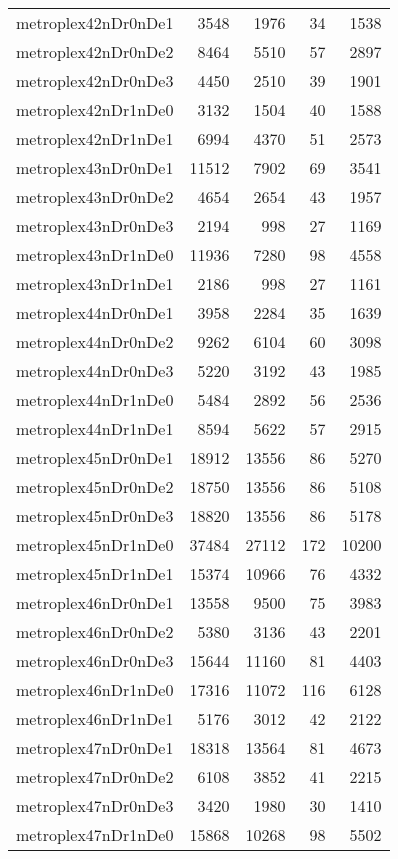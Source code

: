 \begin{tabular}{lrrrr}
metroplex42nDr0nDe1 & 3548 & 1976 & 34 & 1538 \\
metroplex42nDr0nDe2 & 8464 & 5510 & 57 & 2897 \\
metroplex42nDr0nDe3 & 4450 & 2510 & 39 & 1901 \\
metroplex42nDr1nDe0 & 3132 & 1504 & 40 & 1588 \\
metroplex42nDr1nDe1 & 6994 & 4370 & 51 & 2573 \\
metroplex43nDr0nDe1 & 11512 & 7902 & 69 & 3541 \\
metroplex43nDr0nDe2 & 4654 & 2654 & 43 & 1957 \\
metroplex43nDr0nDe3 & 2194 & 998 & 27 & 1169 \\
metroplex43nDr1nDe0 & 11936 & 7280 & 98 & 4558 \\
metroplex43nDr1nDe1 & 2186 & 998 & 27 & 1161 \\
metroplex44nDr0nDe1 & 3958 & 2284 & 35 & 1639 \\
metroplex44nDr0nDe2 & 9262 & 6104 & 60 & 3098 \\
metroplex44nDr0nDe3 & 5220 & 3192 & 43 & 1985 \\
metroplex44nDr1nDe0 & 5484 & 2892 & 56 & 2536 \\
metroplex44nDr1nDe1 & 8594 & 5622 & 57 & 2915 \\
metroplex45nDr0nDe1 & 18912 & 13556 & 86 & 5270 \\
metroplex45nDr0nDe2 & 18750 & 13556 & 86 & 5108 \\
metroplex45nDr0nDe3 & 18820 & 13556 & 86 & 5178 \\
metroplex45nDr1nDe0 & 37484 & 27112 & 172 & 10200 \\
metroplex45nDr1nDe1 & 15374 & 10966 & 76 & 4332 \\
metroplex46nDr0nDe1 & 13558 & 9500 & 75 & 3983 \\
metroplex46nDr0nDe2 & 5380 & 3136 & 43 & 2201 \\
metroplex46nDr0nDe3 & 15644 & 11160 & 81 & 4403 \\
metroplex46nDr1nDe0 & 17316 & 11072 & 116 & 6128 \\
metroplex46nDr1nDe1 & 5176 & 3012 & 42 & 2122 \\
metroplex47nDr0nDe1 & 18318 & 13564 & 81 & 4673 \\
metroplex47nDr0nDe2 & 6108 & 3852 & 41 & 2215 \\
metroplex47nDr0nDe3 & 3420 & 1980 & 30 & 1410 \\
metroplex47nDr1nDe0 & 15868 & 10268 & 98 & 5502 \\

\end{tabular}
